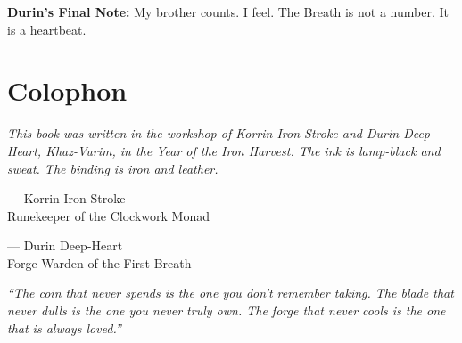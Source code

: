\documentclass[11pt]{book}
\begin{document}
\vspace{0.5cm}
\textbf{Durin's Final Note:} My brother counts. I feel. The Breath is not a number. It is a heartbeat.

\newpage
\section*{Colophon}

\emph{This book was written in the workshop of Korrin Iron-Stroke and Durin Deep-Heart, Khaz-Vurim, in the Year of the Iron Harvest. The ink is lamp-black and sweat. The binding is iron and leather.}

\vspace{0.5cm}
\hfill --- Korrin Iron-Stroke \\
\hfill Runekeeper of the Clockwork Monad

\vspace{0.2cm}
\hfill --- Durin Deep-Heart \\
\hfill Forge-Warden of the First Breath

\vspace{0.5cm}
\hfill \emph{``The coin that never spends is the one you don't remember taking. The blade that never dulls is the one you never truly own. The forge that never cools is the one that is always loved.''}
\end{document}
